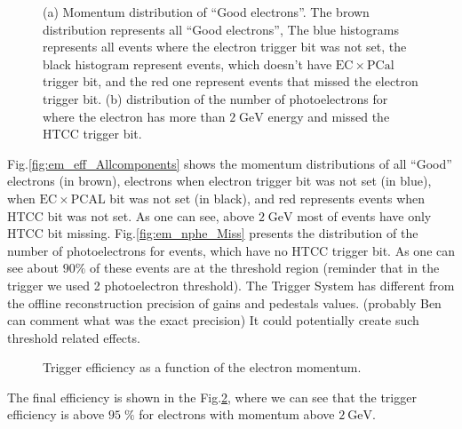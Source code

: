 \begin{figure}[!htb]
 \centering
 \caption{(a) Momentum distribution of ``Good electrons''. The brown distribution represents all ``Good electrons'', The blue histograms represents all events where the electron trigger bit was not set, the black histogram represent events, which doesn't have $\mathrm{EC}\times \mathrm{PCal}$ trigger bit, and the red one represent events that missed the electron trigger bit. (b) distribution of the number of photoelectrons for where the electron has more than $\mathrm{2\;GeV}$ energy and missed the HTCC trigger bit.}
 \label{fig:em_missed_events}
\end{figure}

Fig.\ref{fig:em_eff_Allcomponents} shows the momentum distributions of all ``Good'' electrons (in brown), electrons when electron trigger bit was not set  (in blue), when $\mathrm{EC}\times \mathrm{PCAL}$ bit was not set (in black), and red represents events when HTCC bit was not set. As one can see, above $\mathrm{2\; GeV}$ most of events have only HTCC bit missing.  Fig.\ref{fig:em_nphe_Miss} presents the distribution of the number of photoelectrons for events, which have no  HTCC trigger bit. As one can see about $\mathrm{90\%}$ of these events are    at the threshold region (reminder that in the trigger we used 2 photoelectron threshold).  The Trigger System has different from the offline reconstruction  precision of gains and pedestals values. ({\color{Red}probably Ben can comment what was the exact precision}) It could potentially create  such threshold related effects.

\begin{figure}[!htb]
 \centering
 \caption{Trigger efficiency as a function of the electron momentum.}
 \label{fig:em_eff}
\end{figure}

The final efficiency is shown in the Fig.\ref{fig:em_eff}, where we can see that  the trigger efficiency is above $\mathrm{95\; \%}$
for electrons with momentum above $\mathrm{2\ GeV}$.
